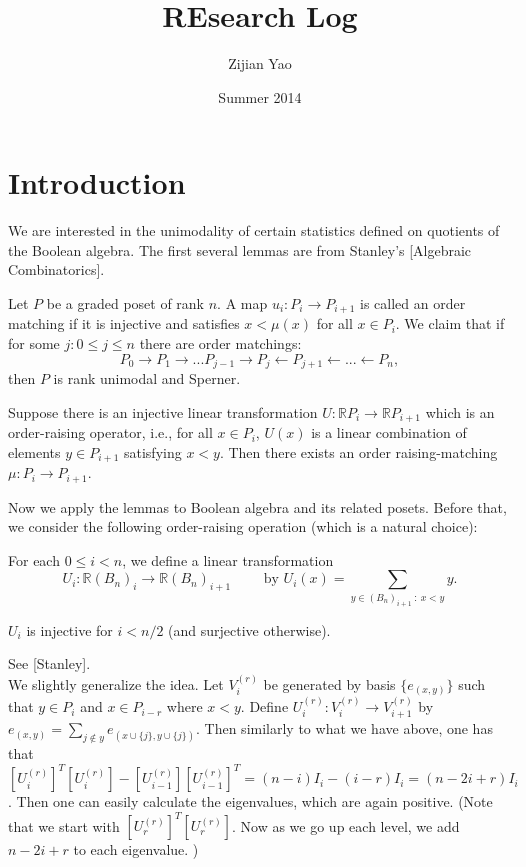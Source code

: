 \documentclass[12pt]{article}
\title{ REsearch Log }
\author{Zijian Yao }
\date{Summer 2014}
\newcommand{\1}{\mathbb{I}}
\newcommand{\R}{\mathbb{R}}
\newcommand{\ra}{\rightarrow}
\theoremstyle{definition}
\theoremstyle{definition}
\theoremstyle{definition}
\theoremstyle{definition}
\theoremstyle{definition}
\theoremstyle{definition}
\begin{document}
\section{Introduction} \indent

We are interested in the unimodality of certain statistics defined on quotients of the Boolean algebra. The first several lemmas are from Stanley's [Algebraic Combinatorics].

\lemma Let $P$ be a graded poset of rank $n$. A map $u_i: P_i \ra P_{i+1}$ is called an order matching if it is injective and satisfies  $x < \mu (x)$ for all $ x \in P_i$.  We claim that if for some $j: 0 \le j \le n$ there are order matchings: $$P_0 \ra P_1 \ra ... P_{j-1} \ra P_j \leftarrow  P_{j+1} \leftarrow ... \leftarrow P_n,$$ then $P$ is rank unimodal and Sperner. 


\lemma Suppose there is an injective linear transformation $U: \R P_i \ra \R P_{i+1} $  which is an order-raising operator, i.e., for all $x \in P_i$, $U(x)$ is a linear combination of elements $y \in P_{i+1}$ satisfying $x < y$. Then there exists an order raising-matching $\mu: P_i \ra P_{i+1}$.   

Now we apply the lemmas to Boolean algebra and its related posets. Before that, we consider the following order-raising operation (which is a natural choice): 

For each $0 \le i < n $, we define a linear transformation $$U_i: \R (B_n)_i \ra \R (B_n)_{i+1} \qquad \text{ by } U_i (x) = \sum_{y \in (B_n)_{i+1} \::\: x < y} y.$$

\lemma{\label{020204}} $U_i$ is injective for $i < n/2$ (and surjective otherwise). 

\proof See [Stanley]. \\

We slightly generalize the idea. Let $V_i^{(r)}$ be generated by basis $\{e_{(x,y)}\}$ such that $y \in P_i$ and $x \in P_{i -r}$ where $x < y$. Define $U_i ^{(r)}: V_{i}^{(r)} \ra V_{i+1}^{(r)} $ by $e_{(x, y)} = \sum_{j \notin y} e_{(x\cup \{j\}, y \cup \{j\} )}$. Then similarly to what we have above, one has that $[U_i^{(r)}]^T [U_i^{(r)}] - [U_{i-1}^{(r)}] [U_{i-1}^{(r)}]^T = (n -i ) I_i - (i-r) I_i = (n-2 i + r) I_i$. Then one can easily calculate the eigenvalues, which are again positive.  (Note that we start with $[U_{r}^{(r)}]^T [U_{r}^{(r)}]$. Now as we go up each level, we add $n-2i + r $ to each eigenvalue. )\\
\end{document}
